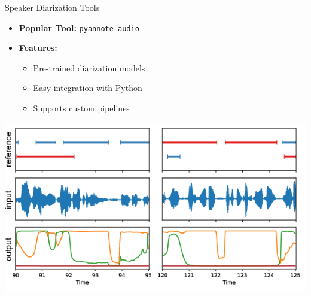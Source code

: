\begin{frame}[allowframebreaks]{Speaker Diarization Tools}
    \begin{itemize}
        \item \textbf{Popular Tool:} \texttt{pyannote-audio}
        \item \textbf{Features:}
            \begin{itemize}
                \item Pre-trained diarization models
                \item Easy integration with Python
                \item Supports custom pipelines
            \end{itemize}
    \end{itemize}
    \begin{center}
        \includegraphics[width=\textwidth,height=0.9\textheight,keepaspectratio]{images/audio-nlp/pyannote_output.png}
    \end{center}
\end{frame}

